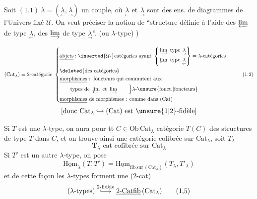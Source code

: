  Soit $(1.1)\ \lambda=(\underset{\leftarrow}{\lambda},\underset{\rightarrow}{\lambda})$ un couple, où $\underset{\leftarrow}{\lambda}$ et $\underset{\rightarrow}{\lambda}$ sont des
ens. de diagrammes de l'Univers fixé $\mathcal U$.
On veut préciser la notion de ``structure  définie
 à l'aide des $\varprojlim$ de type $\underset{\leftarrow}{\lambda}$, des $\varinjlim$ de type $\underset{\rightarrow}{\lambda}$''.
(ou $\lambda$-type) )

{\scriptsize
\[
\begin{aligned}
(\mathrm{Cat}_{\lambda})&=\text{2-catégorie }
\left\{\begin{aligned}
 &\underline{\text{objets}}: \inserted{\mathcal U\text{-}}\text{catégories ayant }
 \left\{\begin{aligned}&\varinjlim\ \text{type }\underset{\rightarrow}{\lambda}\\[-1pt]&\varprojlim\ \text{type }\underset{\leftarrow}{\lambda}\end{aligned}\right\}=\lambda\text{-catégories}\\
 &\text{\deleted{des catégories}}\\
 &\underline{\text{morphismes}}:\text{ foncteurs qui commutent aux}\\
 &\qquad\text{types de }\varprojlim\text{ et }\varinjlim\qquad\Big\} \lambda\text{-}\unsure{\text{fonct.}|\text{foncteurs}}\\
 &\underline{\text{morphismes}}\text{ de morphismes : comme dans }(\mathrm{Cat})
\end{aligned}\right.
\end{aligned}\tag*{(1.2)}
\]
}
\[
[\text{donc }\mathrm{Cat}_{\lambda}\hookrightarrow(\mathrm{Cat})\text{ est }\unsure{1|2}\text{-fidèle}]
\]

Si $T$ est une   $\lambda$-type, on aura
pour tt $C\in\mathrm{Ob}\,\mathrm{Cat}_{\lambda}$  catégorie $T(C)$ des
structures de type $T$ dans $C$, et on trouve ainsi une
catégorie cofibrée sur $\mathrm{Cat}_{\lambda}$, soit $T_{\lambda}$
\[
\mathbf T_{\lambda}\text{ cat cofibrée sur }\mathrm{Cat}_{\lambda}\tag*{(1.3)}
\]
Si $T'$ est un autre  $\lambda$-type, on pose
\[
\underline{\mathrm{Hom}}_{\lambda}(T,T')=\underline{\mathrm{Hom}}_{\mathrm{fib\ sur}\,(\mathrm{Cat}_{\lambda})}(T_{\lambda},T'_{\lambda})\tag*{(1.4)}
\]
et de cette façon les $\lambda$-types forment une (2-cat)
\[
(\lambda\text{-types})\overset{\text{2-fidèle}}{\lhook\joinrel\longrightarrow}\underline{2\text{-}\mathrm{Catfib}}\,(\mathrm{Cat}_{\lambda})\tag*{(1,5)}
\]

